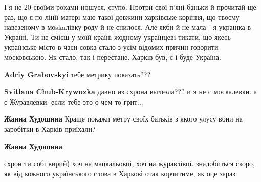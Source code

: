 \begin{itemize}
\begin{itemize}
 

І я не 20 своїми роками ношуся, ступо. Протри свої п'яні баньки й прочитай ще
раз, що я по лінії матері маю такої довжини харківське коріння, що твоєму
навезеному в моskaлівку роду й не снилося. Але якби й не мала - я українка в
Україні. Ти не смієш у моїй країні жодному українцеві тикати, що якесь
українське місто в часи совка стало з усім відомих причин говорити московською.
Як стало, так і перестане. Харків був, є і буде Україна.


 
\textbf{Adriy Grabovskyi} тебе метрику показать???

 
\textbf{Svitlana Chub-Krywuzka} давно из схрона вылезла??? и я не с москалевки. а с Журавлевки. если тебе это о чем то грит...

 
\textbf{Жанна Худошина} Краще покажи метру своїх батьків з якого улусу вони на заробітки в Харків приїхали?

 
\textbf{Жанна Худошина} 

схрон ти собі вирий) хоч на мацкальовці, хоч на журавлівці. знадобиться скоро,
як від кожного українського слова в Харкові отак корчитиме, як оце зараз.


\end{itemize}
\end{itemize}
